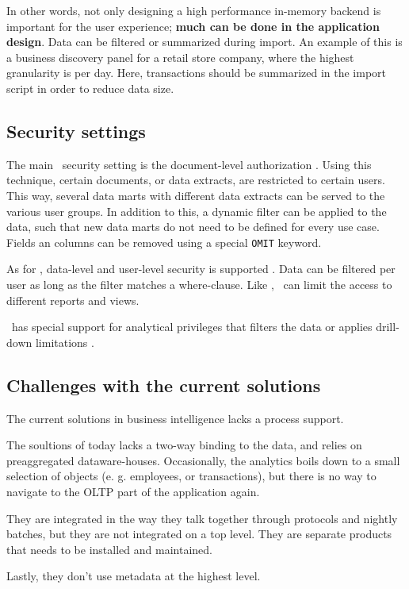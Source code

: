 In other words, not only designing a high performance in-memory backend is important for the user experience; \textbf{much can be done in the application design}. Data can be filtered or summarized during import. An example of this is a business discovery panel for a retail store company, where the highest granularity is per day. Here, transactions should be summarized in the import script in order to reduce data size.
\subsection{Security settings}
\label{sub:Security settings}

The main \qlikview~security setting is the document-level authorization \cite{Qlik2011-hj}. Using this technique, certain documents, or data extracts, are restricted to certain users. This way, several data marts with different data extracts can be served to the various user groups. In addition to this, a dynamic filter can be applied to the data, such that new data marts do not need to be defined for every use case. Fields an columns can be removed using a special \texttt{OMIT} keyword.

As for \tableau, data-level and user-level security is supported \cite{Kamkolkar2015-iq}. Data can be filtered per user as long as the filter matches a where-clause. Like \qlikview, \tableau~can limit the access to different reports and views.

\saph~has special support for analytical privileges that filters the data or applies drill-down limitations \cite{Primsch2011-ij}.

\subsection{Challenges with the current solutions}
The current solutions in business intelligence lacks a process support.

The soultions of today lacks a two-way binding to the data, and relies on preaggregated dataware-houses. Occasionally, the analytics boils down to a small selection of objects (e. g. employees, or transactions), but there is no way to navigate to the OLTP part of the application again.

They are integrated in the way they talk together through protocols and nightly batches, but they are not integrated on a top level. They are separate products that needs to be installed and maintained.

Lastly, they don't use metadata at the highest level.

